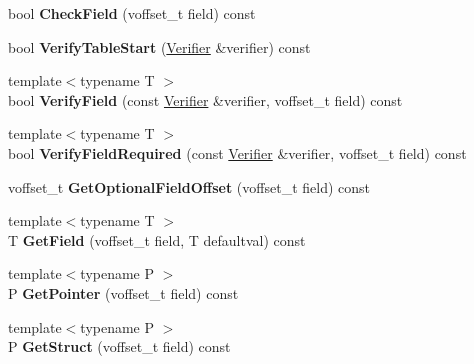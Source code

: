 \begin{DoxyCompactItemize}
bool {\bfseries Check\+Field} (voffset\+\_\+t field) const
\item 
\mbox{\label{classflatbuffers_1_1Table_a6e6d5f025ff609565a840633bb562acd}} 
bool {\bfseries Verify\+Table\+Start} (\hyperlink{classflatbuffers_1_1Verifier}{Verifier} \&verifier) const
\item 
\mbox{\label{classflatbuffers_1_1Table_a22ad7455085012f0433ba42097321faf}} 
{\footnotesize template$<$typename T $>$ }\\bool {\bfseries Verify\+Field} (const \hyperlink{classflatbuffers_1_1Verifier}{Verifier} \&verifier, voffset\+\_\+t field) const
\item 
\mbox{\label{classflatbuffers_1_1Table_a54c62d4a27586b5eff19b9f445d43938}} 
{\footnotesize template$<$typename T $>$ }\\bool {\bfseries Verify\+Field\+Required} (const \hyperlink{classflatbuffers_1_1Verifier}{Verifier} \&verifier, voffset\+\_\+t field) const
\item 
\mbox{\label{classflatbuffers_1_1Table_ab5eb2679e371d9da0ba3172f6d6f4416}} 
voffset\+\_\+t {\bfseries Get\+Optional\+Field\+Offset} (voffset\+\_\+t field) const
\item 
\mbox{\label{classflatbuffers_1_1Table_a70f5dfbdd20de30724a8e05f98741877}} 
{\footnotesize template$<$typename T $>$ }\\T {\bfseries Get\+Field} (voffset\+\_\+t field, T defaultval) const
\item 
\mbox{\label{classflatbuffers_1_1Table_a097d16d7eabd07626936687de1d73f82}} 
{\footnotesize template$<$typename P $>$ }\\P {\bfseries Get\+Pointer} (voffset\+\_\+t field) const
\item 
\mbox{\label{classflatbuffers_1_1Table_a4deb7983161c26792d23ba2a53366701}} 
{\footnotesize template$<$typename P $>$ }\\P {\bfseries Get\+Struct} (voffset\+\_\+t field) const
\item 
\mbox{\label{classflatbuffers_1_1Table_a8c4052c4b37a6cf3d6319b76b70e6637}} 

\end{DoxyCompactItemize}
